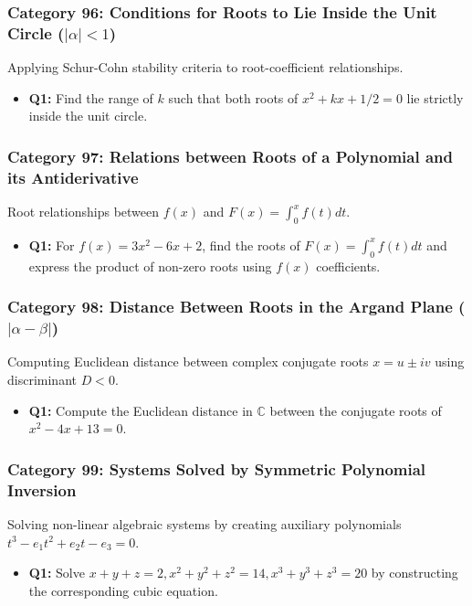 \documentclass[10pt,a4paper]{article}
\begin{document}
\subsubsection{Category 96: Conditions for Roots to Lie Inside the Unit Circle ($|\alpha| < 1$)}
Applying Schur-Cohn stability criteria to root-coefficient relationships.
\begin{itemize}[leftmargin=*]
    \item \textbf{Q1:} Find the range of $k$ such that both roots of $x^2 + kx + 1/2 = 0$ lie strictly inside the unit circle.
\end{itemize}

\subsubsection{Category 97: Relations between Roots of a Polynomial and its Antiderivative}
Root relationships between $f(x)$ and $F(x) = \int_0^x f(t)dt$.
\begin{itemize}[leftmargin=*]
    \item \textbf{Q1:} For $f(x) = 3x^2 - 6x + 2$, find the roots of $F(x) = \int_0^x f(t)dt$ and express the product of non-zero roots using $f(x)$ coefficients.
\end{itemize}

\subsubsection{Category 98: Distance Between Roots in the Argand Plane ($|\alpha - \beta|$)}
Computing Euclidean distance between complex conjugate roots $x = u \pm iv$ using discriminant $D < 0$.
\begin{itemize}[leftmargin=*]
    \item \textbf{Q1:} Compute the Euclidean distance in $\mathbb{C}$ between the conjugate roots of $x^2 - 4x + 13 = 0$.
\end{itemize}

\subsubsection{Category 99: Systems Solved by Symmetric Polynomial Inversion}
Solving non-linear algebraic systems by creating auxiliary polynomials $t^3 - e_1 t^2 + e_2 t - e_3 = 0$.
\begin{itemize}[leftmargin=*]
    \item \textbf{Q1:} Solve $x+y+z=2, x^2+y^2+z^2=14, x^3+y^3+z^3=20$ by constructing the corresponding cubic equation.
\end{itemize}
\end{document}
